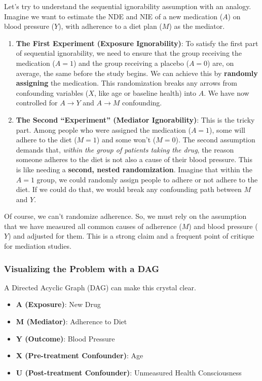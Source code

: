 \documentclass[
  10pt,
  letterpaper,
  DIV=11,
  numbers=noendperiod,
  oneside]{scrartcl}
\providecommand{\tightlist}{%
  \setlength{\itemsep}{0pt}\setlength{\parskip}{0pt}}
\begin{document}
Let's try to understand the sequential ignorability assumption with an
analogy. Imagine we want to estimate the NDE and NIE of a new medication
(\(A\)) on blood pressure (\(Y\)), with adherence to a diet plan (\(M\))
as the mediator.

\begin{enumerate}
\def\labelenumi{\arabic{enumi}.}
\tightlist
\item
  \textbf{The First Experiment (Exposure Ignorability)}: To satisfy the
  first part of sequential ignorability, we need to ensure that the
  group receiving the medication (\(A=1\)) and the group receiving a
  placebo (\(A=0\)) are, on average, the same before the study begins.
  We can achieve this by \textbf{randomly assigning} the medication.
  This randomization breaks any arrows from confounding variables
  (\(X\), like age or baseline health) into \(A\). We have now
  controlled for \(A \to Y\) and \(A \to M\) confounding.
\item
  \textbf{The Second ``Experiment'' (Mediator Ignorability)}: This is
  the tricky part. Among people who were assigned the medication
  (\(A=1\)), some will adhere to the diet (\(M=1\)) and some won't
  (\(M=0\)). The second assumption demands that, \emph{within the group
  of patients taking the drug}, the reason someone adheres to the diet
  is not also a cause of their blood pressure. This is like needing a
  \textbf{second, nested randomization}. Imagine that within the \(A=1\)
  group, we could randomly assign people to adhere or not adhere to the
  diet. If we could do that, we would break any confounding path between
  \(M\) and \(Y\).
\end{enumerate}

Of course, we can't randomize adherence. So, we must rely on the
assumption that we have measured all common causes of adherence (\(M\))
and blood pressure (\(Y\)) and adjusted for them. This is a strong claim
and a frequent point of critique for mediation studies.

\subsubsection{Visualizing the Problem with a
DAG}\label{visualizing-the-problem-with-a-dag}

A Directed Acyclic Graph (DAG) can make this crystal clear.

\begin{itemize}
\tightlist
\item
  \textbf{A (Exposure)}: New Drug
\item
  \textbf{M (Mediator)}: Adherence to Diet
\item
  \textbf{Y (Outcome)}: Blood Pressure
\item
  \textbf{X (Pre-treatment Confounder)}: Age
\item
  \textbf{U (Post-treatment Confounder)}: Unmeasured Health
  Consciousness
\end{itemize}
\end{document}

